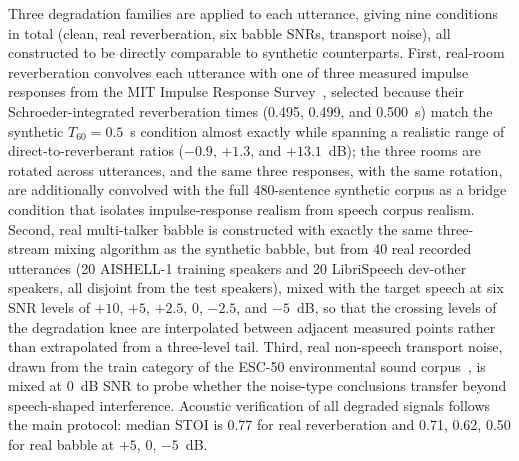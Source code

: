Three degradation families are applied to each utterance, giving nine
conditions in total (clean, real reverberation, six babble SNRs, transport
noise), all constructed to
be directly comparable to synthetic counterparts. First, real-room
reverberation convolves each utterance with one of three measured impulse
responses from the MIT Impulse Response Survey~\cite{traer2016statistics},
selected because their Schroeder-integrated reverberation times (0.495,
0.499, and 0.500~s) match the synthetic $T_{60} = 0.5$~s condition almost
exactly while spanning a realistic range of direct-to-reverberant ratios
($-0.9$, $+1.3$, and $+13.1$~dB); the three rooms are rotated across
utterances, and the same three responses, with the same rotation, are
additionally convolved with the full 480-sentence synthetic corpus as a
bridge condition that isolates impulse-response realism from speech
corpus realism. Second, real multi-talker babble is constructed with exactly
the same three-stream mixing algorithm as the synthetic babble, but from
40 real recorded utterances (20 AISHELL-1 training speakers and 20
LibriSpeech dev-other speakers, all disjoint from the test speakers),
mixed with the target speech at six SNR levels of $+10$, $+5$, $+2.5$, $0$,
$-2.5$, and $-5$~dB, so that the crossing levels of the degradation knee are
interpolated between adjacent measured points rather than extrapolated from
a three-level tail. Third, real non-speech transport noise, drawn from the
train category of the ESC-50 environmental sound corpus~\cite{piczak2015esc},
is mixed at 0~dB SNR to probe whether the noise-type conclusions transfer
beyond speech-shaped interference. Acoustic verification of all degraded
signals follows the main protocol: median STOI is 0.77 for real reverberation
and 0.71, 0.62, 0.50 for real babble at $+5$, $0$, $-5$~dB.

